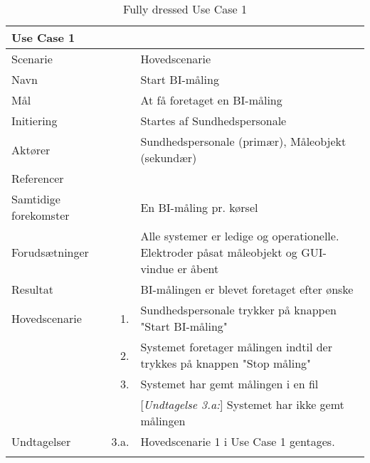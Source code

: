 \documentclass[main.tex]{subfiles}
\begin{document}
\begin{longtabu} to  %
	{\large \textbf{Use Case 1}} && \\
	\toprule
	Scenarie 				&&	Hovedscenarie\\  
	Navn 					&& 	Start BI-måling\\
	Mål 					&& 	At få foretaget en BI-måling\\
	Initiering 				&& 	Startes af Sundhedspersonale\\
	Aktører 				&& 	Sundhedspersonale (primær), Måleobjekt (sekundær)\\
	Referencer 				&& 	\\
	Samtidige forekomster  	&& 	En BI-måling pr. kørsel \\
	Forudsætninger 			&&	Alle systemer er ledige og operationelle. Elektroder påsat måleobjekt og GUI-vindue er åbent\\ 
	Resultat 				&& 	BI-målingen er blevet foretaget efter ønske\\ \midrule
	Hovedscenarie 			&    1. 	&	Sundhedspersonale trykker på knappen "Start BI-måling"\\				 	
							&    2. 	& 	Systemet foretager målingen indtil der trykkes på knappen "Stop måling" \\[-1ex]
							& 	 3.		&	 Systemet har gemt målingen i en fil \\[-1ex]
                            &&[\textit{Undtagelse 3.a:}] Systemet har ikke gemt målingen\\ \midrule
	Undtagelser 			& 3.a. & Hovedscenarie 1 i Use Case 1 gentages.\\ \bottomrule
                         
	
	\caption{Fully dressed Use Case 1}
	\label{UC1}
\end{longtabu}
\end{document}

